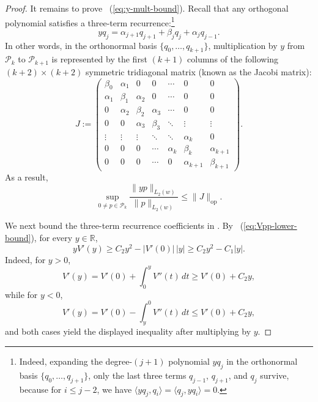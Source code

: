\documentclass[letterpaper,11pt]{article}
\newcommand{\eqref}[1]{~(\ref{#1})}
\theoremstyle{definition}
\newcommand{\op}{\mathrm{op}}
\begin{document}
\begin{proof}
      It remains to prove \eqref{eq:y-mult-bound}. Recall that any orthogonal polynomial satisfies a three-term recurrence:\footnote{
Indeed, expanding the degree-$(j+1)$ polynomial $y q_j$ in the orthonormal basis $\{q_0,\dots,q_{j+1}\}$, only the last three terms $q_{j-1}$, $q_{j+1}$, and $q_j$ survive, because for $i\le j-2$, we have $\langle y q_j,q_i\rangle=\langle q_j,y q_i\rangle=0$.}
\begin{equation}
y q_j
        =
        \alpha_{j+1}q_{j+1}+\beta_j q_j+\alpha_j q_{j-1}.
    \label{eq:threeterm}
\end{equation}
In other words, 
in the orthonormal basis $\{q_0,\dots,q_{k+1}\}$, multiplication by $y$ from $\mathcal P_k$ to $\mathcal P_{k+1}$ is represented by the first $(k+1)$ columns of the following $(k+2)\times (k+2)$ symmetric tridiagonal matrix (known as the Jacobi matrix):
      \[J:=
        \begin{pmatrix}
          \beta_0 & \alpha_1 & 0 & 0 & \cdots & 0 & 0\\
          \alpha_1 & \beta_1 & \alpha_2 & 0 & \cdots & 0 & 0\\
          0 & \alpha_2 & \beta_2 & \alpha_3 & \cdots & 0 & 0\\
          0 & 0 & \alpha_3 & \beta_3 & \ddots & \vdots & \vdots\\
          \vdots & \vdots & \vdots & \ddots & \ddots & \alpha_k & 0\\
          0 & 0 & 0 & \cdots & \alpha_k & \beta_k & \alpha_{k+1}\\
          0 & 0 & 0 & \cdots & 0 & \alpha_{k+1} & \beta_{k+1}
        \end{pmatrix}.
      \]
      As a result,
         \[
        {\sup_{0\ne p\in \mathcal P_k}\frac{\|y p\|_{L_2(w)}}{\|p\|_{L_2(w)}}
        \le
        \|J\|_{\op}.}
      \]

      We next bound the three-term recurrence coefficients in . By \eqref{eq:Vpp-lower-bound}, for every $y\in\mathbb R$,
      \[
        yV'(y)\ge C_2 y^2-|V'(0)|\,|y|
        \geq C_2y^2-C_1|y|.
      \]
      Indeed, for $y>0$,
      \[
        V'(y)=V'(0)+\int_0^y V''(t)\,dt \ge V'(0)+C_2 y,
      \]
      while for $y<0$,
      \[
        V'(y)=V'(0)-\int_y^0 V''(t)\,dt \le V'(0)+C_2 y,
      \]
      and both cases yield the displayed inequality after multiplying by $y$.


\end{proof}
\end{document}
